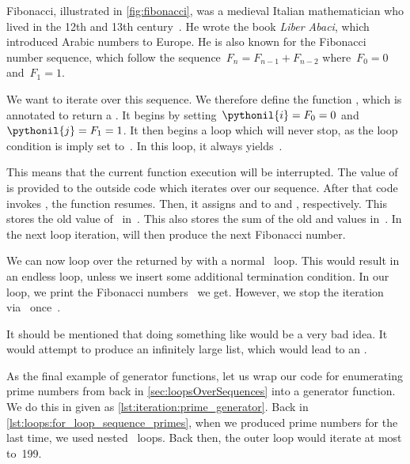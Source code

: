 Fibonacci, illustrated in \cref{fig:fibonacci}, was a medieval Italian mathematician who lived in the 12th and 13th century~.
He wrote the book \emph{Liber Abaci}, which introduced Arabic numbers to Europe.
He is also known for the Fibonacci number sequence, which follow the sequence~$F_n=F_{n-1} + F_{n-2}$ where~$F_0=0$ and~$F_1=1$.

We want to iterate over this sequence.
We therefore define the function , which is annotated to return a .
It begins by setting~$\pythonil{i}=F_0=0$ and~$\pythonil{j}=F_1=1$.
It then begins a  loop which will never stop, as the loop condition is imply set to~.
In this loop, it always yields~.

This means that the current function execution will be interrupted.
The value of  is provided to the outside code which iterates over our sequence.
After that code invokes , the function resumes.
Then, it assigns  and  to  and , respectively.
This stores the old value of~ in~.
This also stores the sum of the old  and  values in~.
In the next loop iteration,  will then produce the next Fibonacci number.

We can now loop over the  returned by  with a normal ~loop.
This would result in an endless loop, unless we insert some additional termination condition.
In our loop, we print the Fibonacci numbers~ we get.
However, we stop the iteration via~ once~.

It should be mentioned that doing something like  would be a very bad idea.
It would attempt to produce an infinitely large list, which would lead to an .

As the final example of generator functions, let us wrap our code for enumerating prime numbers from back in \cref{sec:loopsOverSequences} into a generator function.
We do this in  given as \cref{lst:iteration:prime_generator}.
Back in \cref{lst:loops:for_loop_sequence_primes}, when we produced prime numbers for the last time, we used nested ~loops.
Back then, the outer loop would iterate at most to~199.

